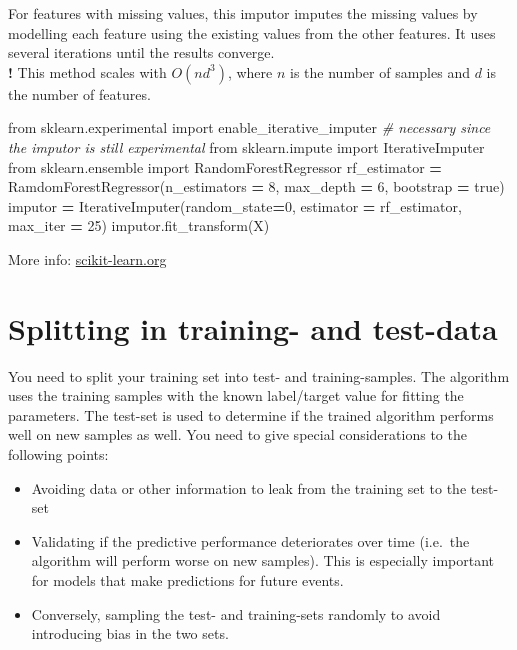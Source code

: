 \documentclass[
]{book}
\newenvironment{Shaded}{\begin{snugshade}}{\end{snugshade}}
\newcommand{\CommentTok}[1]{\textcolor[rgb]{0.56,0.35,0.01}{\textit{#1}}}
\newcommand{\DecValTok}[1]{\textcolor[rgb]{0.00,0.00,0.81}{#1}}
\newcommand{\ImportTok}[1]{#1}
\newcommand{\NormalTok}[1]{#1}
\newcommand{\OperatorTok}[1]{\textcolor[rgb]{0.81,0.36,0.00}{\textbf{#1}}}
\begin{document}
For features with missing values, this imputor imputes the missing
values by modelling each feature using the existing values from the
other features. It uses several iterations until the results converge.\\
\textbf{!} This method scales with \(O(nd^3)\), where \(n\) is the number of
samples and \(d\) is the number of features.

\begin{Shaded}
\begin{Highlighting}[]
\ImportTok{from}\NormalTok{ sklearn.experimental }\ImportTok{import}\NormalTok{ enable\_iterative\_imputer }\CommentTok{\# necessary since the imputor is still experimental}
\ImportTok{from}\NormalTok{ sklearn.impute }\ImportTok{import}\NormalTok{ IterativeImputer}
\ImportTok{from}\NormalTok{ sklearn.ensemble }\ImportTok{import}\NormalTok{ RandomForestRegressor }
\NormalTok{rf\_estimator }\OperatorTok{=}\NormalTok{ RamdomForestRegressor(n\_estimators }\OperatorTok{=} \DecValTok{8}\NormalTok{, max\_depth }\OperatorTok{=} \DecValTok{6}\NormalTok{, bootstrap }\OperatorTok{=}\NormalTok{ true)}
\NormalTok{imputor }\OperatorTok{=}\NormalTok{ IterativeImputer(random\_state}\OperatorTok{=}\DecValTok{0}\NormalTok{, estimator }\OperatorTok{=}\NormalTok{ rf\_estimator, max\_iter }\OperatorTok{=} \DecValTok{25}\NormalTok{)}
\NormalTok{imputor.fit\_transform(X)}
\end{Highlighting}
\end{Shaded}

More info:
\href{https://scikit-learn.org/stable/modules/generated/sklearn.impute.IterativeImputer.html}{scikit-learn.org}\\

\hypertarget{splitting-in-training--and-test-data}{%
\section{Splitting in training- and test-data}\label{splitting-in-training--and-test-data}}

You need to split your training set into test- and training-samples. The
algorithm uses the training samples with the known label/target value
for fitting the parameters. The test-set is used to determine if the
trained algorithm performs well on new samples as well. You need to give
special considerations to the following points:

\begin{itemize}
\item
  Avoiding data or other information to leak from the training set to
  the test-set
\item
  Validating if the predictive performance deteriorates over time
  (i.e.~the algorithm will perform worse on new samples). This is
  especially important for models that make predictions for future
  events.
\item
  Conversely, sampling the test- and training-sets randomly to avoid
  introducing bias in the two sets.
\end{itemize}
\end{document}
